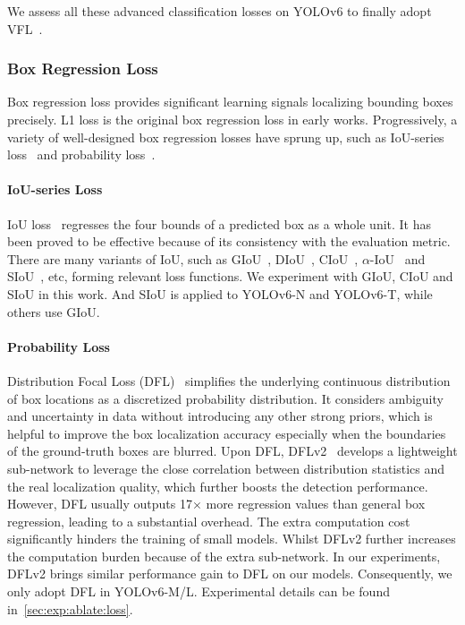 \documentclass[10pt,twocolumn,letterpaper]{article}
\begin{document}
  We assess all these advanced classification losses on YOLOv6 to finally adopt VFL~\cite{zhang2021varifocalnet}.
  
  \subsubsection{Box Regression Loss}
  Box regression loss provides significant learning signals localizing bounding boxes precisely. L1 loss is the original box regression loss in early works. Progressively, a variety of well-designed box regression losses have sprung up, such as IoU-series loss~\cite{yu2016unitbox, zheng2020distance,rezatofighi2019generalized, zheng2020distance,he2021alpha,gevorgyan2022siou} and probability loss~\cite{li2020generalized}.
   
  
  \paragraph{IoU-series Loss}
  IoU loss~\cite{yu2016unitbox} regresses the four bounds of a predicted box as a whole unit. It has been proved to be effective because of its consistency with the evaluation metric. There are many variants of IoU, such as GIoU~\cite{rezatofighi2019generalized}, DIoU~\cite{zheng2020distance}, CIoU~\cite{zheng2020distance}, $\alpha$-IoU~\cite{he2021alpha} and SIoU~\cite{gevorgyan2022siou}, etc, forming relevant loss functions. We experiment with GIoU, CIoU and SIoU in this work. And SIoU is applied to YOLOv6-N and YOLOv6-T, while others use GIoU.
  
  \paragraph{Probability Loss}
  Distribution Focal Loss (DFL)~\cite{li2020generalized} simplifies the underlying continuous distribution of box locations as a discretized probability distribution. It considers ambiguity and uncertainty in data without introducing any other strong priors, which is helpful to improve the box localization accuracy especially when the boundaries of the ground-truth boxes are blurred. Upon DFL, DFLv2~\cite{li2021generalized} develops a lightweight sub-network to leverage the close correlation between distribution statistics and the real localization quality, which further boosts the detection performance. However, DFL usually outputs 17${\times}$ more regression values than general box regression, leading to a substantial overhead. The extra computation cost significantly hinders the training of small models. Whilst DFLv2 further increases the computation burden because of the extra sub-network. In our experiments, DFLv2 brings similar performance gain to DFL on our models. Consequently, we only adopt DFL in YOLOv6-M/L. Experimental details can be found in~\cref{sec:exp:ablate:loss}.
  
\end{document}
